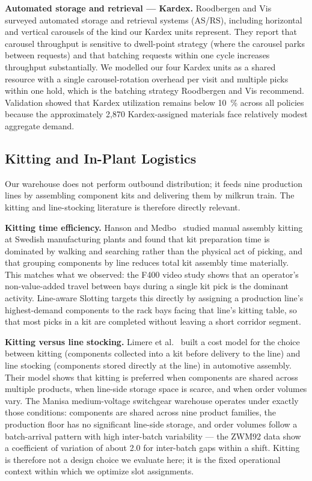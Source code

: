 \medskip
\noindent\textbf{Automated storage and retrieval — Kardex.}
Roodbergen and Vis~\cite{roodbergen2009} surveyed automated storage and
retrieval systems (AS/RS), including horizontal and vertical carousels of
the kind our Kardex units represent.
They report that carousel throughput is sensitive to dwell-point strategy
(where the carousel parks between requests) and that batching requests
within one cycle increases throughput substantially.
We modelled our four Kardex units as a shared resource with a single
carousel-rotation overhead per visit and multiple picks within one hold,
which is the batching strategy Roodbergen and Vis recommend.
Validation showed that Kardex utilization remains below
\SI{10}{\percent} across all policies because the approximately 2,870
Kardex-assigned materials face relatively modest aggregate demand.

\subsection{Kitting and In-Plant Logistics}\label{subsec:kitting}

Our warehouse does not perform outbound distribution; it feeds nine
production lines by assembling component kits and delivering them by
milkrun train.
The kitting and line-stocking literature is therefore directly relevant.

\medskip
\noindent\textbf{Kitting time efficiency.}
Hanson and Medbo~\cite{hanson2012} studied manual assembly kitting at
Swedish manufacturing plants and found that kit preparation time is
dominated by walking and searching rather than the physical act of picking,
and that grouping components by line reduces total kit assembly time
materially.
This matches what we observed: the F400 video study shows that an
operator's non-value-added travel between bays during a single kit pick is
the dominant activity.
Line-aware Slotting targets this directly by assigning a production line's
highest-demand components to the rack bays facing that line's kitting
table, so that most picks in a kit are completed without leaving a short
corridor segment.

\medskip
\noindent\textbf{Kitting versus line stocking.}
Limere et al.~\cite{limere2012} built a cost model for the choice between
kitting (components collected into a kit before delivery to the line) and
line stocking (components stored directly at the line) in automotive
assembly.
Their model shows that kitting is preferred when components are shared
across multiple products, when line-side storage space is scarce, and when
order volumes vary.
The Manisa medium-voltage switchgear warehouse operates under exactly those
conditions: components are shared across nine product families, the
production floor has no significant line-side storage, and order volumes
follow a batch-arrival pattern with high inter-batch variability — the
ZWM92 data show a coefficient of variation of about 2.0 for inter-batch
gaps within a shift.
Kitting is therefore not a design choice we evaluate here; it is the fixed
operational context within which we optimize slot assignments.

